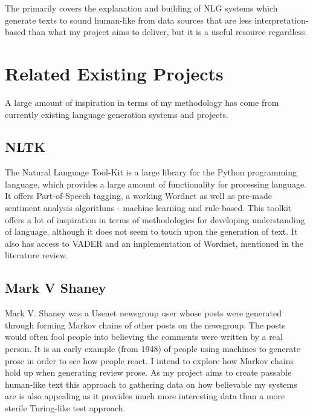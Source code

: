The primarily covers the explanation and building of NLG systems which generate texts to sound human-like from data sources that are less interpretation-based than what my project aims to deliver, but it is a useful resource regardless.

\section{Related Existing Projects}
A large amount of inspiration in terms of my methodology has come from currently existing language generation systems and projects.
\subsection{NLTK}
The Natural Language Tool-Kit is a large library for the Python programming language, which provides a large amount of functionality for processing language. It offers Part-of-Speech tagging, a working Wordnet as well as pre-made sentiment analysis algorithms - machine learning and rule-based.
This toolkit offers a lot of inspiration in terms of methodologies for developing understanding of language, although it does not seem to touch upon the generation of text. It also has access to VADER and an implementation of Wordnet, mentioned in the literature review.

\subsection{Mark V Shaney}
Mark V. Shaney was a Usenet newsgroup user whose posts were generated through forming Markov chains of other posts on the newsgroup. The posts would often fool people into believing the comments were written by a real person. It is an early example (from 1948) of people using machines to generate prose in order to see how people react. I intend to explore how Markov chains hold up when generating review prose. As my project aims to create passable human-like text this approach to gathering data on how believable my systems are is also appealing as it provides much more interesting data than a more sterile Turing-like test approach.

